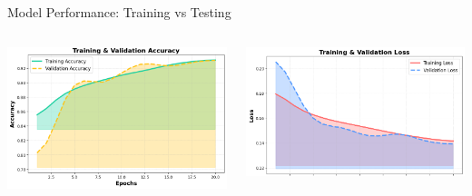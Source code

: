 \begin{frame}{Model Performance: Training vs Testing}

    \begin{columns}

        \centering
        \includegraphics[width=1\linewidth]{figures/accuracy plot.png} %

        \centering
        \includegraphics[width=1\linewidth]{figures/loss plot.png} %

    \end{columns}

\end{frame}



